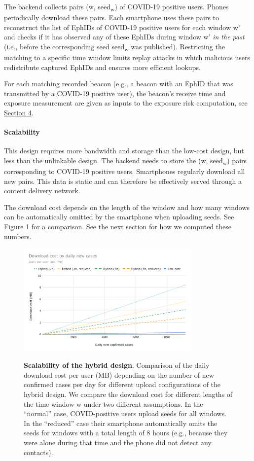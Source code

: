 \documentclass{article}
\begin{document}
The backend collects pairs (w, seed\textsubscript{w}) of COVID-19
positive users. Phones periodically download these pairs. Each
smartphone uses these pairs to reconstruct the list of EphIDs of
COVID-19 positive users for each window w' and checks if it has observed
any of these EphIDs during window w' \emph{in the past} (i.e., before
the corresponding seed seed\textsubscript{w} was published). Restricting
the matching to a specific time window limits replay attacks in which
malicious users redistribute captured EphIDs and ensures more efficient
lookups.

For each matching recorded beacon (e.g., a beacon with an EphID that was
transmitted by a COVID-19 positive user), the beacon's receive time and
exposure measurement are given as inputs to the exposure risk
computation, see \protect\hyperlink{exposure-estimation}{{Section 4}}.


\paragraph{Scalability}
This design requires more bandwidth and storage than the low-cost
design, but less than the unlinkable design. The backend needs to store
the (w, seed\textsubscript{w}) pairs corresponding to COVID-19 positive
users. Smartphones regularly download all new pairs. This data is static
and can therefore be effectively served through a content delivery
network.

The download cost depends on the length of the window and how many
windows can be automatically omitted by the smartphone when uploading
seeds. See Figure \ref{fig:scale_hybrid} for a comparison. See the next section for how we
computed these numbers.


\begin{figure}\centering
\includegraphics[width=0.8\textwidth]{figs/scalability_hybrid.png}
\label{fig:scale_hybrid}
\caption{\textbf{Scalability of the hybrid design}. Comparison of the
daily download cost per user (MB) depending on the number of new
confirmed cases per day for different upload configurations of the
hybrid design. We compare the download cost for different lengths of the
time window w under two different assumptions. In the ``normal'' case,
COVID-positive users upload seeds for all windows. In the ``reduced''
case their smartphone automatically omits the seeds for windows with a
total length of 8 hours (e.g., because they were alone during that time
and the phone did not detect any contacts).}
\end{figure}
\end{document}
